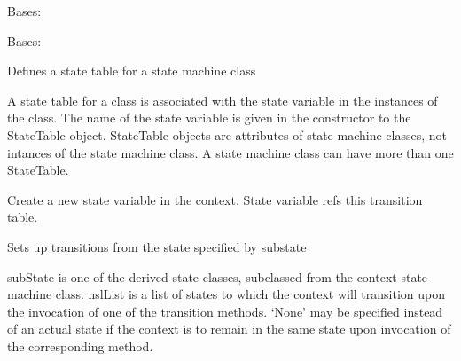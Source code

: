\documentclass[letterpaper,10pt,english]{sphinxmanual}
\begin{document}
\begin{fulllineitems}
\label{enuActor:enuActor.DecoratorStateMachine.ContextBase}
Bases: 

\end{fulllineitems}


\begin{fulllineitems}
\label{enuActor:enuActor.DecoratorStateMachine.TransitionTable}
Bases: 

Defines a state table for a state machine class

A state table for a class is associated with the state variable in the instances
of the class. The name of the state variable is given in the constructor to the 
StateTable object.  StateTable objects are attributes of state machine classes, 
not intances of the state machine class.   A state machine class can have more
than one StateTable.

\begin{fulllineitems}
\label{enuActor:enuActor.DecoratorStateMachine.TransitionTable.initialize}
Create a new state variable in the context.  State variable refs this
transition table.

\end{fulllineitems}


\begin{fulllineitems}
\label{enuActor:enuActor.DecoratorStateMachine.TransitionTable.nextStates}
Sets up transitions from the state specified by substate

subState is one of the derived state classes, subclassed from the
context state machine class. nslList is a list of states to which 
the context will transition upon the invocation of one of the 
transition methods.  `None' may be specified instead of an actual
state if the context is to remain in the same state upon invocation
of the corresponding method.

\end{fulllineitems}


\end{fulllineitems}
\end{document}
